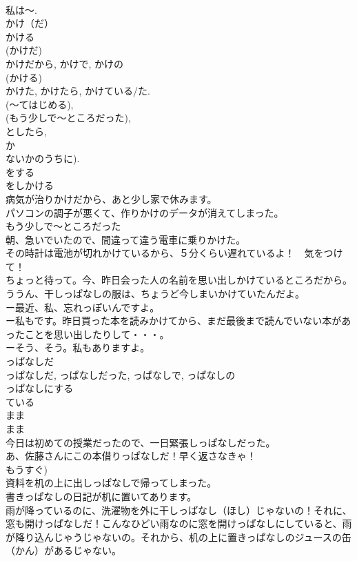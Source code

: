 \documentclass[8pt]{extreport}
\begin{document}
\begin{CJK}{UTF8}{min}
\\	私は～.	
\\	かけ（だ）
\\	かける
\\	(かけだ) 
\\	かけだから, かけで, かけの
\\	(かける) 
\\	かけた, かけたら, かけている/た.
\\	(～てはじめる), 
\\	(もう少しで～ところだった), 
\\	としたら, 
\\	か
\\	ないかのうちに). 
\\	をする 
\\	をしかける
\\	病気が治りかけだから、あと少し家で休みます。
\\	パソコンの調子が悪くて、作りかけのデータが消えてしまった。
\\	もう少しで～ところだった 
\\	朝、急いでいたので、間違って違う電車に乗りかけた。
\\	その時計は電池が切れかけているから、５分くらい遅れているよ！　気をつけて！
\\	ちょっと待って。今、昨日会った人の名前を思い出しかけているところだから。
\\	ううん、干しっぱなしの服は、ちょうど今しまいかけていたんだよ。
\\	ー最近、私、忘れっぽいんですよ。
\\	ー私もです。昨日買った本を読みかけてから、まだ最後まで読んでいない本があったことを思い出したりして・・・。
\\	ーそう、そう。私もありますよ。	
\\	っぱなしだ
\\	っぱなしだ, っぱなしだった, っぱなしで, っぱなしの
\\	っぱなしにする
\\	ている 
\\	まま 
\\	まま 
\\	今日は初めての授業だったので、一日緊張しっぱなしだった。
\\	あ、佐藤さんにこの本借りっぱなしだ！早く返さなきゃ！
\\	もうすぐ)
\\	資料を机の上に出しっぱなしで帰ってしまった。
\\	書きっぱなしの日記が机に置いてあります。
\\	雨が降っているのに、洗濯物を外に干しっぱなし（ほし）じゃないの！それに、窓も開けっぱなしだ！こんなひどい雨なのに窓を開けっぱなしにしていると、雨が降り込んじゃうじゃないの。それから、机の上に置きっぱなしのジュースの缶（かん）があるじゃない。

\end{CJK}
\end{document}
